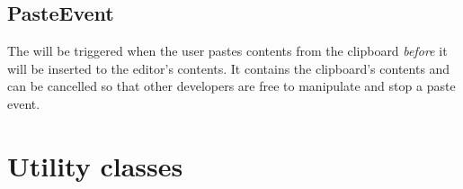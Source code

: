 \subsection{PasteEvent}
\label{subsec:paste_event}

The  will be triggered when the user pastes contents from the clipboard \textit{before} it will be inserted to the editor's contents. It contains the clipboard's contents and can be cancelled so that other developers are free to manipulate and stop a paste event.


%





\section{Utility classes}

